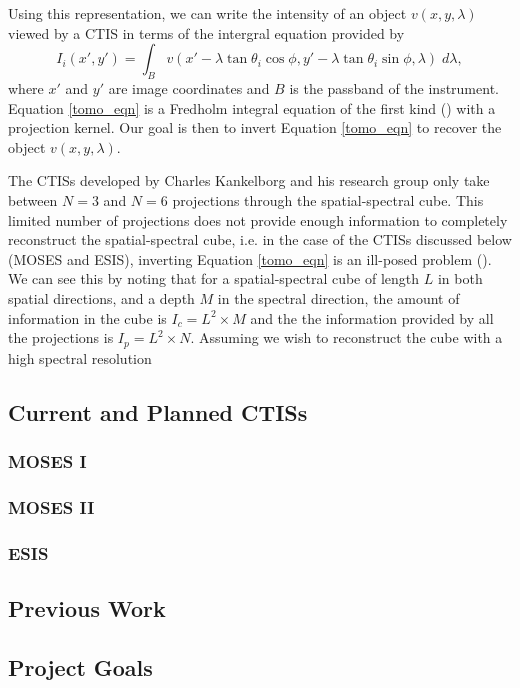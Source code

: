 \documentclass{article}
\begin{document}
			Using this representation, we can write the intensity of an object $v(x,y,\lambda)$ viewed by a CTIS in terms of the intergral equation provided by \cite{fox1}
			\begin{equation}
				I_i (x',y') = \int_B v(x' - \lambda \tan \theta_i \cos \phi, y' - \lambda \tan \theta_i \sin \phi, \lambda) \; d\lambda,
				\label{tomo_eqn}
			\end{equation}
			where $x'$ and $y'$ are image coordinates and $B$ is the passband of the instrument. Equation \ref{tomo_eqn} is a Fredholm integral equation of the first kind (\cite{RHB}) with a projection kernel. Our goal is then to invert Equation \ref{tomo_eqn} to recover the object $v(x,y,\lambda)$.
			
			The CTISs developed by Charles Kankelborg and his research group only take between $N=3$ and $N=6$ projections through the spatial-spectral cube. This limited number of projections does not provide enough information to completely reconstruct the spatial-spectral cube, i.e. in the case of the CTISs discussed below (MOSES and ESIS), inverting Equation \ref{tomo_eqn} is an ill-posed problem (\cite{inversion}). We can see this by noting that for a spatial-spectral cube of length $L$ in both spatial directions, and a depth $M$ in the spectral direction, the amount of information in the cube is $I_c = L^2 \times M$ and the the information provided by all the projections is $I_p = L^2 \times N$. Assuming we wish to reconstruct the cube with a high spectral resolution 
			
		\subsection{Current and Planned CTISs}
			
			\subsubsection{MOSES I}
			\subsubsection{MOSES II}
			\subsubsection{ESIS}
		\subsection{Previous Work}
			\label{pwork}
		\subsection{Project Goals}
\end{document}
